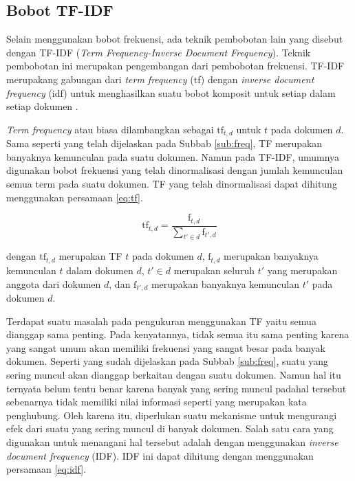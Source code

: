 \subsection{Bobot TF-IDF}
\label{sub:tf-idf}
Selain menggunakan bobot frekuensi, ada teknik pembobotan lain yang disebut dengan TF-IDF (\textit{Term Frequency-Inverse Document Frequency}). Teknik pembobotan ini merupakan pengembangan dari pembobotan frekuensi. TF-IDF merupakang gabungan dari \textit{term frequency} (tf) dengan \textit{inverse document frequency} (idf) untuk menghasilkan suatu bobot komposit untuk setiap \term dalam setiap dokumen \cite{schutze2008introduction}.

\textit{Term frequency} atau biasa dilambangkan sebagai $\textrm{tf}_{t,d}$ untuk \term $t$ pada dokumen $d$. Sama seperti yang telah dijelaskan pada Subbab \ref{sub:freq}, TF merupakan banyaknya kemunculan \term pada suatu dokumen. Namun pada TF-IDF, umumnya digunakan bobot frekuensi yang telah dinormalisasi dengan jumlah kemunculan semua term pada suatu dokumen. TF yang telah dinormalisasi dapat dihitung menggunakan persamaan \ref{eq:tf}.

\begin{equation}
	\label{eq:tf}
	\textrm{tf}_{t,d}=\frac{\textrm{f}_{t,d}}{\sum_{t' \in d}\textrm{f}_{t',d}}
\end{equation}

dengan $\textrm{tf}_{t,d}$ merupakan TF \term $t$ pada dokumen $d$, $\textrm{f}_{t,d}$ merupakan banyaknya kemunculan \term $t$ dalam dokumen $d$, $t' \in d$ merupakan seluruh \term $t'$ yang merupakan anggota dari dokumen $d$, dan $\textrm{f}_{t',d}$ merupakan banyaknya kemunculan \term $t'$ pada dokumen $d$.

Terdapat suatu masalah pada pengukuran menggunakan TF yaitu semua \term dianggap sama penting. Pada kenyatannya, tidak semua \term itu sama penting karena \term yang sangat umum akan memiliki frekuensi yang sangat besar pada banyak dokumen. Seperti yang sudah dijelaskan pada Subbab \ref{sub:freq}, suatu \term yang sering muncul akan dianggap berkaitan dengan suatu dokumen. Namun hal itu ternyata belum tentu benar karena banyak \term yang sering muncul padahal \term tersebut sebenarnya tidak memiliki nilai informasi seperti \term yang merupakan kata penghubung. Oleh karena itu, diperlukan suatu mekanisme untuk mengurangi efek dari suatu \term yang sering muncul di banyak dokumen. Salah satu cara yang digunakan untuk menangani hal tersebut adalah dengan menggunakan \textit{inverse document frequency} (IDF). IDF ini dapat dihitung dengan menggunakan persamaan \ref{eq:idf}.

